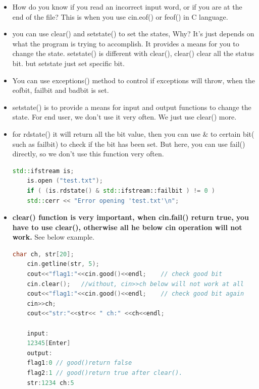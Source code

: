 \documentclass[a4paper,11pt,twoside]{book}
\begin{document}
\begin{itemize}
	\item How do you know if you read an incorrect input word, or if you are at the end of the file? This is when you use cin.eof() or feof() in C language.
	
	
	\item you can use clear() and setstate() to set the states, Why? It's just depends on what the program is trying to accomplish.  It provides a means for you to change the state. setstate() is different with clear(), clear() clear all the status bit. but setstate just set specific bit.
	
	\item You can use exceptions() method to control if exceptions will throw, when the eofbit, failbit and badbit is set.
	
	\item setstate() is to provide a means for input and output functions to change the state. For end user, we don't use it very often. We just use clear() more.
	
	\item for rdstate() it will return all the bit value, then you can use \& to certain bit( such as failbit) to check if the bit has been set. But here, you can use fail() directly, so we don't use this function very often.
	\begin{lstlisting}[frame=single, language=c++]
	std::ifstream is;
	is.open ("test.txt");
	if ( (is.rdstate() & std::ifstream::failbit ) != 0 )
	std::cerr << "Error opening 'test.txt'\n";
	\end{lstlisting}
	
	
	\item \textbf{clear() function is very important, when cin.fail() return true, you have to use clear(), otherwise all he below cin operation will not work.} See below example.
	
	\begin{lstlisting}[frame=single, language=c++]
	char ch, str[20];
	cin.getline(str, 5);
	cout<<"flag1:"<<cin.good()<<endl;    // check good bit
	cin.clear();   //without, cin>>ch below will not work at all
	cout<<"flag1:"<<cin.good()<<endl;    // check good bit again
	cin>>ch;
	cout<<"str:"<<str<< " ch:" <<ch<<endl;
	
	input:
	12345[Enter]
	output:
	flag1:0 // good()return false
	flag2:1 // good()return true after clear().
	str:1234 ch:5
	\end{lstlisting}
	
\end{itemize}
\end{document}
